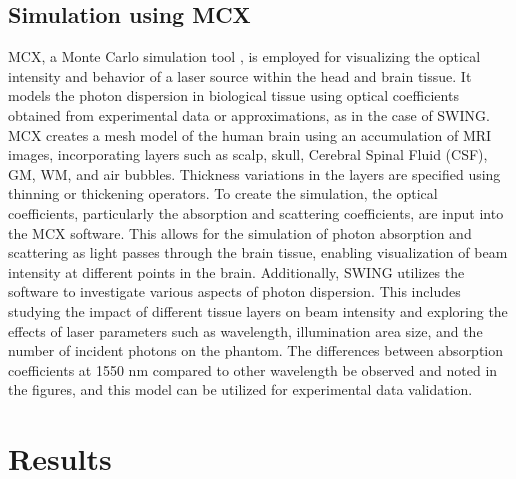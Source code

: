 \documentclass[journal,twoside,web]{ieeecolor}
\begin{document}

\subsection{Simulation using MCX}
MCX, a Monte Carlo simulation tool \cite{b6}, is employed for visualizing the optical intensity and behavior of a laser source within the head and brain tissue. 
It models the photon dispersion in biological tissue using optical coefficients obtained from experimental data or approximations, as in the case of SWING. 
MCX creates a mesh model of the human brain using an accumulation of MRI images, incorporating layers such as scalp, skull, Cerebral Spinal Fluid (CSF), GM, WM, 
and air bubbles. Thickness variations in the layers are specified using thinning or thickening operators. To create the simulation, the optical coefficients, particularly the absorption and scattering coefficients, are input into the MCX software. This allows 
for the simulation of photon absorption and scattering as light passes through the brain tissue, enabling visualization of beam intensity at different points in the brain.
Additionally, SWING utilizes the software to investigate various aspects of photon dispersion. This includes studying the impact of different tissue layers 
on beam intensity and exploring the effects of laser parameters such as wavelength, illumination area size, and the number of incident photons on the phantom. 
The differences between absorption coefficients at 1550 nm compared to other wavelength be observed and noted in the figures, and this 
model can be utilized for experimental data validation.

\section{Results}
\label{sec:results}
\end{document}
